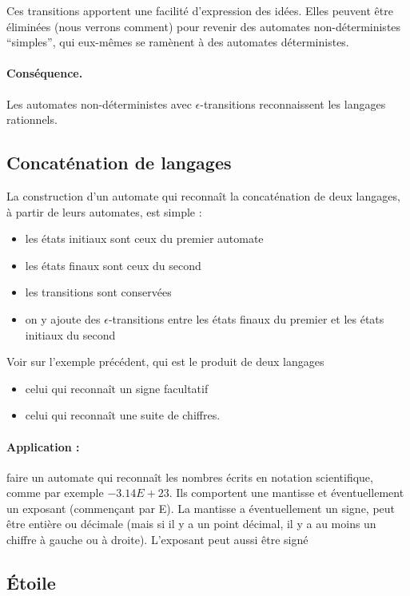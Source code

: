 \documentclass[10pt,twoside]{article}
\begin{document}
Ces transitions apportent une facilité d'expression des idées.
Elles peuvent être éliminées (nous verrons comment) pour revenir
des automates non-déterministes ``simples'', qui eux-mêmes se ramènent
à des automates déterministes.

\paragraph{Conséquence.} Les automates non-déterministes
 avec $\epsilon$-transitions reconnaissent les langages rationnels.
 

\subsection{Concaténation de langages}

La construction d'un automate qui reconnaît la concaténation de 
deux langages, à partir de leurs automates, est simple :
\begin{itemize}
\item les états initiaux sont ceux du premier automate
\item les états finaux sont ceux du second
\item les transitions sont conservées
\item on y ajoute des $\epsilon$-transitions entre les états finaux du premier et les états initiaux du second
\end{itemize}


Voir sur l'exemple précédent, qui est le produit de deux langages
\begin{itemize}
\item celui qui reconnaît un signe facultatif
\item celui qui reconnaît une suite de chiffres.
\end{itemize}

\paragraph{Application : } faire un automate qui reconnaît les
nombres écrits en notation scientifique, comme par exemple 
$ -3.14E+23 $.  Ils comportent une mantisse et éventuellement un 
exposant (commençant par E). La mantisse a éventuellement un signe,
peut être entière ou décimale (mais si il y a un point décimal,
il y a au moins un chiffre à gauche ou à droite). L'exposant
 peut aussi être signé

\subsection{Étoile}
\end{document}
